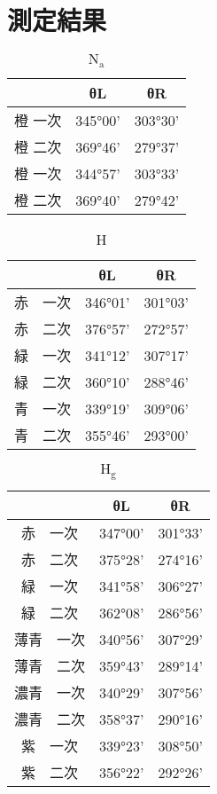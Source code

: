 \documentclass{jsarticle}
\begin{document}
\section{測定結果}


\begin{table}[H]
\centering
\caption{$\textrm{N}_\textrm{a}$}
\label{my-label}
\begin{tabular}{|c|c|c|}
\hline
     & θL      & θR      \\ \hline
橙 一次 & 345°00' & 303°30' \\ \hline
橙 二次 & 369°46' & 279°37' \\ \hline
橙 一次 & 344°57' & 303°33' \\ \hline
橙 二次 & 369°40' & 279°42' \\ \hline
\end{tabular}
\end{table}

\begin{table}[H]
\centering
\caption{H}
\label{my-label}
\begin{tabular}{|c|c|c|}
\hline
     & θL      & θR      \\ \hline
赤　一次 & 346°01' & 301°03' \\ \hline
赤　二次 & 376°57' & 272°57' \\ \hline
緑　一次 & 341°12' & 307°17' \\ \hline
緑　二次 & 360°10' & 288°46' \\ \hline
青　一次 & 339°19' & 309°06' \\ \hline
青　二次 & 355°46' & 293°00' \\ \hline
\end{tabular}
\end{table}

\begin{table}[H]
\centering
\caption{$\textrm{H}_\textrm{g}$}
\label{my-label}
\begin{tabular}{|c|c|c|}
\hline
      & θL      & θR      \\ \hline
赤　一次  & 347°00' & 301°33' \\ \hline
赤　二次  & 375°28' & 274°16' \\ \hline
緑　一次  & 341°58' & 306°27' \\ \hline
緑　二次  & 362°08' & 286°56' \\ \hline
薄青　一次 & 340°56' & 307°29' \\ \hline
薄青　二次 & 359°43' & 289°14' \\ \hline
濃青　一次 & 340°29' & 307°56' \\ \hline
濃青　二次 & 358°37' & 290°16' \\ \hline
紫　一次  & 339°23' & 308°50' \\ \hline
紫　二次  & 356°22' & 292°26' \\ \hline
\end{tabular}
\end{table}
\end{document}
